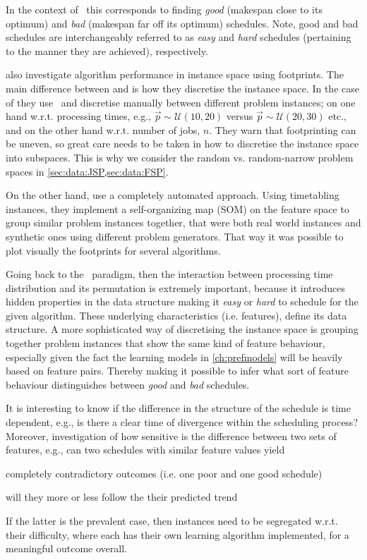 \clearpage

In the context of \jsp\ this corresponds to finding \emph{good} (makespan close to its optimum)  and \emph{bad} (makespan far off its optimum) schedules. Note, good and bad schedules are interchangeably referred to as \emph{easy} and \emph{hard} schedules (pertaining to the manner they are achieved), respectively. 

\citet{SmithMilesLion5} also investigate algorithm performance in instance space using footprints. The main difference between \citeauthor{Corne10} and \citeauthor{SmithMilesLion5} is how they discretise the instance space. In the case of \citeauthor{Corne10} they use \jsp\ and discretise manually between different problem instances; on one hand w.r.t. processing times, e.g.,  $\vec{p}\sim \mathcal{U}(10,20)$ versus $\vec{p}\sim \mathcal{U}(20,30)$ etc., and on the other hand w.r.t. number of jobs, $n$. 
They warn that footprinting can be uneven, so great care needs to be taken in 
how to discretise the instance space into subspaces. 
This is why we consider the random vs. random-narrow problem spaces in 
\cref{sec:data:JSP,sec:data:FSP}.

On the other hand, \citeauthor{SmithMilesLion5} use a completely automated 
approach. Using timetabling instances, they implement a self-organizing map 
(SOM) on the feature space to group similar problem instances together, that 
were both real world instances and synthetic ones using different problem 
generators. That way it was possible to plot visually the footprints for 
several algorithms.

Going back to the \jsp\ paradigm, then the interaction between processing time 
distribution and its permutation is extremely important, because it introduces 
hidden properties in the data structure making it \emph{easy} or \emph{hard} to 
schedule for the given algorithm. These underlying characteristics (i.e. 
features), define its data structure. A more sophisticated way of discretising 
the instance space is grouping together problem instances that show the same 
kind of feature behaviour, especially given the fact the learning models in 
\cref{ch:prefmodels} will be heavily based on feature pairs. Thereby making it 
possible to infer what sort of feature behaviour distinguishes  between 
\emph{good} and \emph{bad} schedules. 

It is interesting to know if the difference in the structure of the schedule is 
time dependent, e.g.,  is there a clear time of divergence within the 
scheduling process? 
Moreover, investigation of how sensitive is the difference between two sets of 
features, e.g., can two schedules with similar feature values yield 
\begin{enumerate*}[label={{}}, 
  itemjoin={{? }}, itemjoin*={{? Or }}, after={{? }}]
  \item completely contradictory outcomes (i.e. one poor and one good schedule)
  \item will they more or less follow the their predicted trend
\end{enumerate*}
If the latter is the prevalent case, then instances need to be segregated 
w.r.t. their difficulty, where each has their own learning algorithm 
implemented, for a meaningful outcome overall.  

